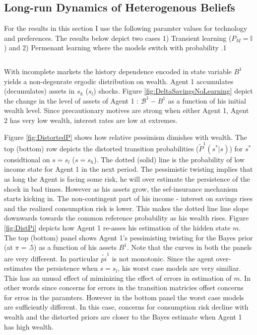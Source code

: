 \documentclass[12pt]{article}
\begin{document}
\subsection{ Long-run Dynamics of Heterogenous Beliefs}
For the results in this section I use the following paramter values for technology and preferences. The results below depict two cases 1) Transient learning ($P_M=\mathbb{I}$) and 2) Permenant learning where the models switch with probability .1

\[\]


\noindent With incomplete markets the history dependence encoded in state variable $B^1$ yields a non-degenrate ergodic distribution on wealth. Agent 1 accumulates (decumulates) assets in $s_h$ ($s_l$) shocks. Figure \ref{fig:DeltaSavingsNoLearning} depict the change in the level of assets of Agent 1 : $\mathcal{B}^1-B^1$ as a function of his initial wealth level. Since precautionary motives are strong when either Agent 1, Agent 2 has very low wealth, interest rates are low at extremes. 

\noindent Figure \ref{fig:DistortedP} shows how relative pessimism dimishes with wealth. The top (bottom) row depicts the distorted transition probabilities ($\tilde{P}^1(s^*|s)$) for $s^*$ considtional on $s=s_l$ ($s=s_h$). The dotted (solid) line is the probability of low income state for Agent 1 in the next period. The pessimistic twisting implies that as long the Agent is facing some risk, he will over estimate the persistence of the shock in bad times. However as his assets grow, the sef-insurance mechanism starts kicking in. The non-contingent part of his income - interest on savings rises and the realized consumption risk is lower. This makes the dotted line line slope downwards towards the common reference probability as his wealth rises. Figure \ref{fig:DistPi} depicts how Agent 1 re-asses his estimation of the hidden state $m$. The top (bottom) panel shows  Agent 1's  pessimisting twisting for the Bayes prior (at $\pi=.5$) as a function of his assets $B^1$. Note that the curves in both the panels 
are very different. In particular $\tilde{pi}^1$ is not monotonic. Since the agent over-estimates the persistence when $s=s_l$, his worst case models are very similiar. This has an unusal effect of miminizing the effect of errors in estimation of $m$. In other words since concerns for errors in the transition matricies offset concerns for erros in the paramters. However in the bottom panel the worst case models are sufficiently different. In this case, concerns for consumption risk decline with wealth and the distorted priors are closer to the Bayes estimate when Agent 1 has high wealth. 
\end{document}
